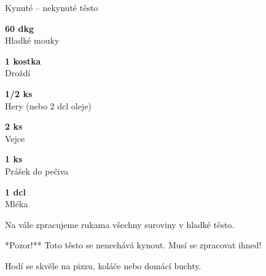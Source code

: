 \documentclass[11pt,a4paper]{article}
\begin{document}
\begin{recipe}[ForestGreen]{Kynuté – nekynuté těsto}
    \begin{ingredients}
        \item \parbox[t]{\linewidth}{\raggedright \weight \textbf{60 dkg}\\ Hladké mouky}
        \item \parbox[t]{\linewidth}{\raggedright \piece \textbf{1 kostka}\\ Droždí}
        \item \parbox[t]{\linewidth}{\raggedright \weight \textbf{1/2 ks}\\ Hery (nebo 2 dcl oleje)}
        \item \parbox[t]{\linewidth}{\raggedright \piece \textbf{2 ks}\\ Vejce}
        \item \parbox[t]{\linewidth}{\raggedright \piece \textbf{1 ks}\\ Prášek do pečiva}
        \item \parbox[t]{\linewidth}{\raggedright \liquid \textbf{1 dcl}\\ Mléka}
    \end{ingredients}
    \begin{steps}
        \item Na vále zpracujeme rukama všechny suroviny v hladké těsto.
        \item **Pozor!** Toto těsto se nenechává kynout. Musí se zpracovat ihned!
        \item Hodí se skvěle na pizzu, koláče nebo domácí buchty.
    \end{steps}
\end{recipe}
\end{document}
